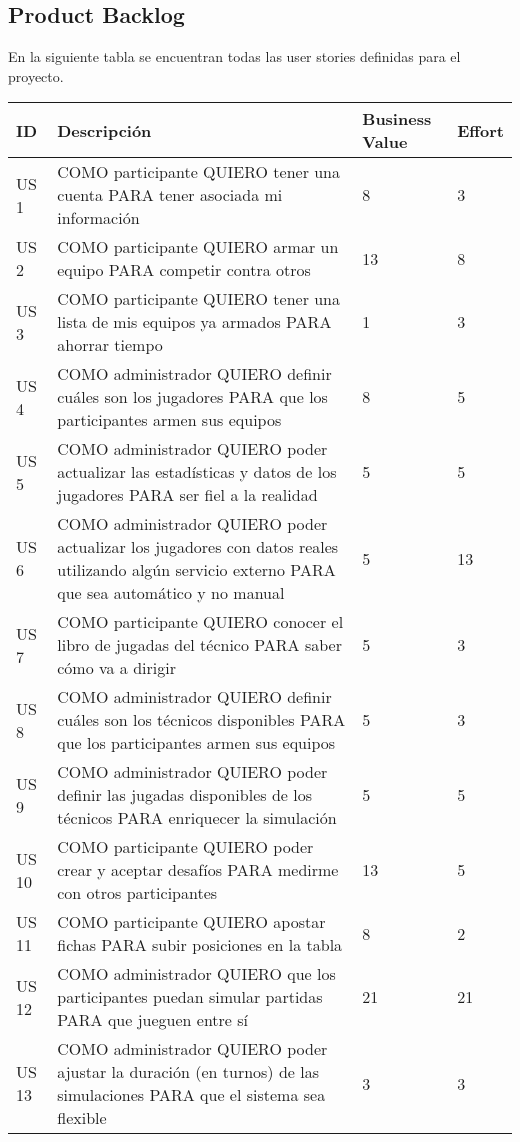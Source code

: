 \subsection{Product Backlog}
\indent En la siguiente tabla se encuentran todas las user stories definidas para el proyecto.\\

\begin{center}
  \begin{tabular}{| l | p{10cm} | l | l | }
    \hline
ID & Descripción & Business Value & Effort\\  \hline
US 1 & COMO participante QUIERO tener una cuenta PARA tener asociada mi información & 8 & 3\\  \hline
US 2 & COMO participante QUIERO armar un equipo PARA competir contra otros & 13 & 8\\  \hline
US 3 & COMO participante QUIERO tener una lista de mis equipos ya armados PARA ahorrar tiempo & 1 & 3\\  \hline
US 4 & COMO administrador QUIERO definir cuáles son los jugadores PARA que los participantes armen sus equipos & 8 & 5\\  \hline
US 5 & COMO administrador QUIERO poder actualizar las estadísticas y datos de los jugadores PARA ser fiel a la realidad & 5 & 5\\  \hline
US 6 & COMO administrador QUIERO poder actualizar los jugadores con datos reales utilizando algún servicio externo PARA que sea automático y no manual & 5 & 13\\  \hline
US 7 & COMO participante QUIERO conocer el libro de jugadas del técnico PARA saber cómo va a dirigir & 5 & 3\\  \hline
US 8 & COMO administrador QUIERO definir cuáles son los técnicos disponibles PARA que los participantes armen sus equipos & 5 & 3\\  \hline
US 9 & COMO administrador QUIERO poder definir las jugadas disponibles de los técnicos PARA enriquecer la simulación & 5 & 5\\  \hline
US 10 & COMO participante QUIERO poder crear y aceptar desafíos PARA medirme con otros participantes & 13 & 5\\  \hline
US 11 & COMO participante QUIERO apostar fichas PARA subir posiciones en la tabla & 8 & 2\\  \hline
US 12 & COMO administrador QUIERO que los participantes puedan simular partidas PARA que jueguen entre sí & 21 & 21\\  \hline
US 13 & COMO administrador QUIERO poder ajustar la duración (en turnos) de las simulaciones PARA que el sistema sea flexible & 3 & 3\\  \hline

\end{tabular}
\end{center}
